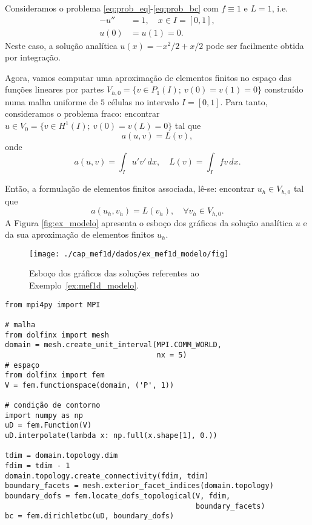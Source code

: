 \begin{ex}\label{ex:mef1d_modelo}
  Consideramos o problema \eqref{eq:prob_eq}-\eqref{eq:prob_bc} com $f\equiv 1$ e $L=1$, i.e.
  \begin{align}
    -u'' &= 1,\quad x\in I=[0,1],\label{eq:ex_modelo_eq}\\
    u(0) &= u(1) = 0.\label{eq:ex_modelo_bc}
  \end{align}
Neste caso, a solução analítica $u(x) = -x^2/2+x/2$ pode ser facilmente obtida por integração.

Agora, vamos computar uma aproximação de elementos finitos no espaço das funções lineares por partes $V_{h,0} = \{v\in P_1(I);~v(0)=v(1)=0\}$ construído numa malha uniforme de $5$ células no intervalo $I=[0, 1]$. Para tanto, consideramos o problema fraco: encontrar $u\in V_0 = \{v\in H^1(I);~v(0)=v(L)=0\}$ tal que
\begin{equation}
  a(u, v) = L(v),
\end{equation}
onde
\begin{equation}
  a(u, v) = \int_I u'v'\,dx,\quad L(v)=\int_I fv\,dx.
\end{equation}

Então, a formulação de elementos finitos associada, lê-se: encontrar $u_h\in V_{h,0}$ tal que
\begin{equation}
  a(u_h, v_h) = L(v_h),\quad\forall v_h\in V_{h,0}.
\end{equation}
A Figura \ref{fig:ex_modelo} apresenta o esboço dos gráficos da solução analítica $u$ e da sua aproximação de elementos finitos $u_h$.

\begin{figure}[h!]
  \centering
  \texttt{[image: ./cap\_mef1d/dados/ex\_mef1d\_modelo/fig]}
  \caption{Esboço dos gráficos das soluções referentes ao Exemplo~\ref{ex:mef1d_modelo}.}
  \label{fig:ex_mef1d_modelo}
\end{figure}

\begin{lstlisting}[caption=ex\_mef1d\_modelo.py]
from mpi4py import MPI

# malha
from dolfinx import mesh
domain = mesh.create_unit_interval(MPI.COMM_WORLD,
                                   nx = 5)
# espaço
from dolfinx import fem
V = fem.functionspace(domain, ('P', 1))

# condição de contorno
import numpy as np
uD = fem.Function(V)
uD.interpolate(lambda x: np.full(x.shape[1], 0.))

tdim = domain.topology.dim
fdim = tdim - 1
domain.topology.create_connectivity(fdim, tdim)
boundary_facets = mesh.exterior_facet_indices(domain.topology)
boundary_dofs = fem.locate_dofs_topological(V, fdim,
                                            boundary_facets)
bc = fem.dirichletbc(uD, boundary_dofs)


\end{lstlisting}
\end{ex}
